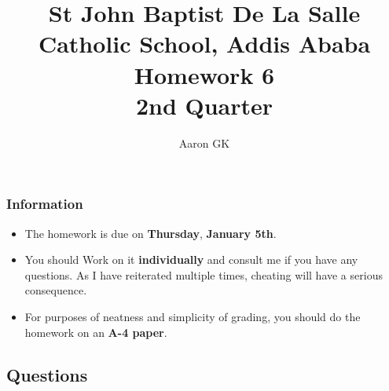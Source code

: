 \documentclass[9pt,addpoints]{exam}
\author{Aaron GK}
\begin{document}
	\title{St John Baptist De La Salle Catholic School, Addis Ababa\\
		\large Homework 6 \\
		2nd Quarter}
	\maketitle
	\begin{center}
		\subsubsection*{Information}
		\begin{itemize}
			\item The homework is due on \textbf{Thursday}, \textbf{January 5th}.
			\item You should Work on it \textbf{individually} and consult me if you have any questions. As I have reiterated multiple times, cheating will have a serious consequence.
			\item For purposes of neatness and simplicity of grading, you should do the homework on an \textbf{A-4 paper}.
		\end{itemize}
	\end{center}
	\begin{center}
		\subsection*{Questions}
	\end{center}
	
\end{document}
